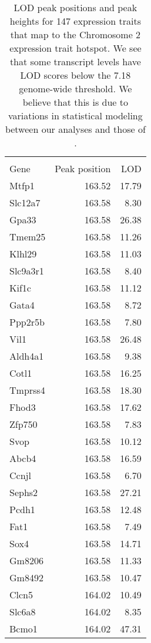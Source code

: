 \documentclass[oneside]{book}
\begin{document}
{\tiny
\begin{longtable}{lrr}
\caption{LOD peak positions and peak heights for 147 expression traits that map to the Chromosome 2 expression trait hotspot. We see that some transcript levels have LOD scores below the 7.18 genome-wide threshold. We believe that this is due to variations in statistical modeling between our analyses and those of \citet{keller2018genetic}.}\\ 
\hline \\

Gene & Peak position & LOD \\
  \hline
Mtfp1 & 163.52 & 17.79 \\
  Slc12a7 & 163.58 & 8.30 \\
  Gpa33 & 163.58 & 26.38 \\
  Tmem25 & 163.58 & 11.26 \\
  Klhl29 & 163.58 & 11.03 \\
  Slc9a3r1 & 163.58 & 8.40 \\
  Kif1c & 163.58 & 11.12 \\
  Gata4 & 163.58 & 8.72 \\
  Ppp2r5b & 163.58 & 7.80 \\
  Vil1 & 163.58 & 26.48 \\
  Aldh4a1 & 163.58 & 9.38 \\
  Cotl1 & 163.58 & 16.25 \\
  Tmprss4 & 163.58 & 18.30 \\
  Fhod3 & 163.58 & 17.62 \\
  Zfp750 & 163.58 & 7.83 \\
  Svop & 163.58 & 10.12 \\
  Abcb4 & 163.58 & 16.59 \\
  Ccnjl & 163.58 & 6.70 \\
  Sephs2 & 163.58 & 27.21 \\
  Pcdh1 & 163.58 & 12.48 \\
  Fat1 & 163.58 & 7.49 \\
  Sox4 & 163.58 & 14.71 \\
  Gm8206 & 163.58 & 11.33 \\
  Gm8492 & 163.58 & 10.47 \\
  Clcn5 & 164.02 & 10.49 \\
  Slc6a8 & 164.02 & 8.35 \\
  Bcmo1 & 164.02 & 47.31 \\

\end{longtable}}
\end{document}
